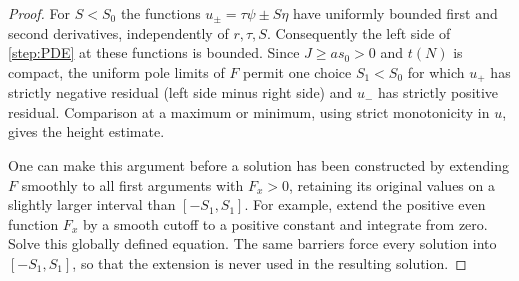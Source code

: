\documentclass[11pt]{article}
\numberwithin{equation}{section}
\theoremstyle{definition}
\theoremstyle{remark}
\begin{document}
\begin{proof}
For $S<S_0$ the functions $u_\pm=\tau\psi\pm S\eta$ have uniformly
bounded first and second derivatives, independently of $r,\tau,S$.
Consequently the left side of \cref{step:PDE} at these functions is
bounded.  Since $J\ge as_0>0$ and $t(N)$ is compact, the uniform pole
limits of $F$ permit one choice $S_1<S_0$ for which $u_+$ has strictly
negative residual (left side minus right side) and $u_-$ has strictly
positive residual.  Comparison at a maximum or minimum, using strict
monotonicity in $u$, gives the height estimate.

One can make this argument before a solution has been constructed by
extending $F$ smoothly to all first arguments with $F_x>0$, retaining its
original values on a slightly larger interval than $[-S_1,S_1]$.  For
example, extend the positive even function $F_x$ by a smooth cutoff to a
positive constant and integrate from zero.  Solve this globally defined
equation.  The same barriers force every solution into $[-S_1,S_1]$, so
that the extension is never used in the resulting solution.


\end{proof}
\end{document}
